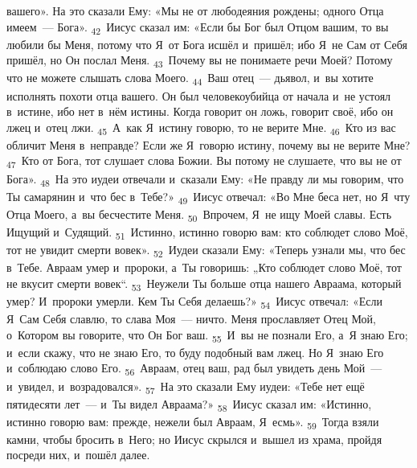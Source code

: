 \documentclass[a4paper,12pt]{article}
\begin{document}
вашего». На это сказали Ему: «Мы не от любодеяния рождены; одного Отца имеем~--- Бога». \textsubscript{42}~Иисус сказал им: «Если бы Бог был Отцом вашим, то вы любили бы Меня, потому что Я~от Бога исшёл и~пришёл; ибо Я~не Сам от Себя пришёл, но Он послал Меня. \textsubscript{43}~Почему вы не понимаете речи Моей? Потому что не можете слышать слова Моего. \textsubscript{44}~Ваш отец~--- дьявол, и~вы хотите исполнять похоти отца вашего. Он был человекоубийца от начала и~не устоял в~истине, ибо нет в~нём истины. Когда говорит он ложь, говорит своё, ибо он лжец и~отец лжи. \textsubscript{45}~А~как Я~истину говорю, то не верите Мне. \textsubscript{46}~Кто из вас обличит Меня в~неправде? Если же Я~говорю истину, почему вы не верите Мне? \textsubscript{47}~Кто от Бога, тот слушает слова Божии. Вы потому не слушаете, что вы не от Бога». \textsubscript{48}~На это иудеи отвечали и~сказали Ему: «Не правду ли мы говорим, что Ты самарянин и~что бес в~Тебе?» \textsubscript{49}~Иисус отвечал: «Во Мне беса нет, но Я~чту Отца Моего, а~вы бесчестите Меня. \textsubscript{50}~Впрочем, Я~не ищу Моей славы. Есть Ищущий и~Судящий. \textsubscript{51}~Истинно, истинно говорю вам: кто соблюдет слово Моё, тот не увидит смерти вовек». \textsubscript{52}~Иудеи сказали Ему: «Теперь узнали мы, что бес в~Тебе. Авраам умер и~пророки, а~Ты говоришь: „Кто соблюдет слово Моё, тот не вкусит смерти вовек“. \textsubscript{53}~Неужели Ты больше отца нашего Авраама, который умер? И~пророки умерли. Кем Ты Себя делаешь?» \textsubscript{54}~Иисус отвечал: «Если Я~Сам Себя славлю, то слава Моя~--- ничто. Меня прославляет Отец Мой, о~Котором вы говорите, что Он Бог ваш. \textsubscript{55}~И~вы не познали Его, а~Я знаю Его; и~если скажу, что не знаю Его, то буду подобный вам лжец. Но Я~знаю Его и~соблюдаю слово Его. \textsubscript{56}~Авраам, отец ваш, рад был увидеть день Мой~--- и~увидел, и~возрадовался». \textsubscript{57}~На это сказали Ему иудеи: «Тебе нет ещё пятидесяти лет~--- и~Ты видел Авраама?» \textsubscript{58}~Иисус сказал им: «Истинно, истинно говорю вам: прежде, нежели был Авраам, Я~есмь». \textsubscript{59}~Тогда взяли камни, чтобы бросить в~Него; но Иисус скрылся и~вышел из храма, пройдя посреди них, и~пошёл далее. 
\end{document}
